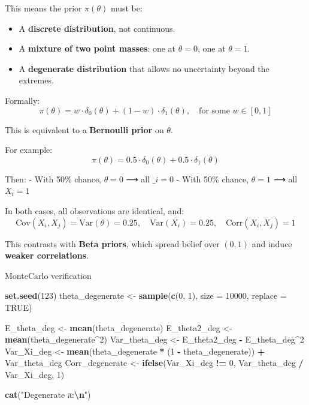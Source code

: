 \documentclass[
]{article}
\newenvironment{Shaded}{\begin{snugshade}}{\end{snugshade}}
\newcommand{\AttributeTok}[1]{\textcolor[rgb]{0.13,0.29,0.53}{#1}}
\newcommand{\ConstantTok}[1]{\textcolor[rgb]{0.56,0.35,0.01}{#1}}
\newcommand{\DecValTok}[1]{\textcolor[rgb]{0.00,0.00,0.81}{#1}}
\newcommand{\FunctionTok}[1]{\textcolor[rgb]{0.13,0.29,0.53}{\textbf{#1}}}
\newcommand{\NormalTok}[1]{#1}
\newcommand{\OtherTok}[1]{\textcolor[rgb]{0.56,0.35,0.01}{#1}}
\newcommand{\SpecialCharTok}[1]{\textcolor[rgb]{0.81,0.36,0.00}{\textbf{#1}}}
\newcommand{\StringTok}[1]{\textcolor[rgb]{0.31,0.60,0.02}{#1}}
\providecommand{\tightlist}{%
  \setlength{\itemsep}{0pt}\setlength{\parskip}{0pt}}
\begin{document}
This means the prior \(\pi(\theta)\) must be:

\begin{itemize}
\tightlist
\item
  A \textbf{discrete distribution}, not continuous.
\item
  A \textbf{mixture of two point masses}: one at \(\theta = 0\), one at
  \(\theta = 1\).
\item
  A \textbf{degenerate distribution} that allows no uncertainty beyond
  the extremes.
\end{itemize}

Formally: \[
\pi(\theta) = w \cdot \delta_0(\theta) + (1 - w) \cdot \delta_1(\theta), \quad \text{for some } w \in [0, 1]
\]

This is equivalent to a \textbf{Bernoulli prior} on \(\theta\).

For example: \[
\pi(\theta) = 0.5 \cdot \delta_0(\theta) + 0.5 \cdot \delta_1(\theta)
\]

Then: - With 50\% chance, \(\theta = 0\) ⟶ all \(\_i = 0\) - With 50\%
chance, \(\theta = 1\) ⟶ all \(X_i = 1\)

In both cases, all observations are identical, and: \[
\text{Cov}(X_i, X_j) = \text{Var}(\theta) = 0.25, \quad 
\text{Var}(X_i) = 0.25, \quad 
\text{Corr}(X_i, X_j) = 1
\]

This contrasts with \textbf{Beta priors}, which spread belief over
\((0,1)\) and induce \textbf{weaker correlations}.

MonteCarlo verification

\begin{Shaded}
\begin{Highlighting}[]
\FunctionTok{set.seed}\NormalTok{(}\DecValTok{123}\NormalTok{)}
\NormalTok{theta\_degenerate }\OtherTok{\textless{}{-}} \FunctionTok{sample}\NormalTok{(}\FunctionTok{c}\NormalTok{(}\DecValTok{0}\NormalTok{, }\DecValTok{1}\NormalTok{), }\AttributeTok{size =} \DecValTok{10000}\NormalTok{, }\AttributeTok{replace =} \ConstantTok{TRUE}\NormalTok{)}

\NormalTok{E\_theta\_deg }\OtherTok{\textless{}{-}} \FunctionTok{mean}\NormalTok{(theta\_degenerate)}
\NormalTok{E\_theta2\_deg }\OtherTok{\textless{}{-}} \FunctionTok{mean}\NormalTok{(theta\_degenerate}\SpecialCharTok{\^{}}\DecValTok{2}\NormalTok{)}
\NormalTok{Var\_theta\_deg }\OtherTok{\textless{}{-}}\NormalTok{ E\_theta2\_deg }\SpecialCharTok{{-}}\NormalTok{ E\_theta\_deg}\SpecialCharTok{\^{}}\DecValTok{2}
\NormalTok{Var\_Xi\_deg }\OtherTok{\textless{}{-}} \FunctionTok{mean}\NormalTok{(theta\_degenerate }\SpecialCharTok{*}\NormalTok{ (}\DecValTok{1} \SpecialCharTok{{-}}\NormalTok{ theta\_degenerate)) }\SpecialCharTok{+}\NormalTok{ Var\_theta\_deg}
\NormalTok{Corr\_degenerate }\OtherTok{\textless{}{-}} \FunctionTok{ifelse}\NormalTok{(Var\_Xi\_deg }\SpecialCharTok{!=} \DecValTok{0}\NormalTok{, Var\_theta\_deg }\SpecialCharTok{/}\NormalTok{ Var\_Xi\_deg, }\DecValTok{1}\NormalTok{)}

\FunctionTok{cat}\NormalTok{(}\StringTok{"Degenerate π:}\SpecialCharTok{\textbackslash{}n}\StringTok{"}\NormalTok{)}
\end{Highlighting}
\end{Shaded}
\end{document}
